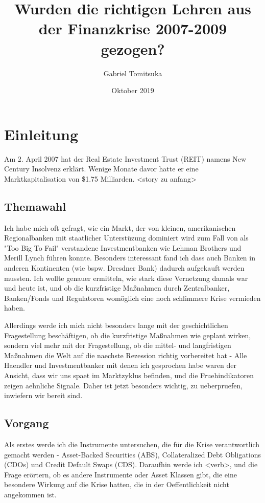 \documentclass[a4paper,draft]{report}
\begin{document}
\title{Wurden die richtigen Lehren aus der Finanzkrise 2007-2009 gezogen?}
\author{Gabriel Tomitsuka}
\date{Oktober 2019}
\maketitle

\tableofcontents

\section{Einleitung}
Am 2. April 2007 hat der Real Estate Investment Trust (REIT) namens New Century Insolvenz erklärt.
Wenige Monate davor hatte er eine Marktkapitalisation von \$1.75 Milliarden.
<story zu anfang>

\subsection{Themawahl}
Ich habe mich oft gefragt, wie ein Markt, der von kleinen, amerikanischen Regionalbanken mit staatlicher Unterstüzung
dominiert wird zum Fall von als "Too Big To Fail" verstandene Investmentbanken wie Lehman Brothers und Merill Lynch
führen konnte. Besonders interessant fand ich dass auch Banken in anderen Kontinenten (wie bspw. Dresdner Bank) dadurch 
aufgekauft werden mussten. Ich wollte genauer ermitteln, wie stark diese Vernetzung damals war und heute ist, und ob
die kurzfristige Maßnahmen durch Zentralbanker, Banken/Fonds und Regulatoren womöglich eine noch schlimmere Krise
vermieden haben.

Allerdings werde ich mich nicht besonders lange mit der geschichtlichen Fragestellung beschäftigen, ob die kurzfristige
Maßnahmen wie geplant wirken, sondern viel mehr mit der Fragestellung, ob die mittel- und langfristigen Maßnahmen die Welt
auf die naechste Rezession richtig vorbereitet hat - Alle Haendler und Investmentbanker mit denen ich gesprochen habe waren
der Ansicht, dass wir uns spaet im Marktzyklus befinden, und die Fruehindikatoren zeigen aehnliche Signale.
Daher ist jetzt besonders wichtig, zu ueberpruefen, inwiefern wir bereit sind.

\subsection{Vorgang}
Als erstes werde ich die Instrumente untersuchen, die für die Krise verantwortlich gemacht werden - Asset-Backed Securities (ABS), 
Collateralized Debt Obligations (CDOs) und Credit Default Swaps (CDS). Daraufhin werde ich <verb>, und die Frage erörtern, ob es andere 
Instrumente oder Asset Klassen gibt, die eine besondere Wirkung auf die Krise hatten, die in der Oeffentlichkeit nicht angekommen ist.
\end{document}
